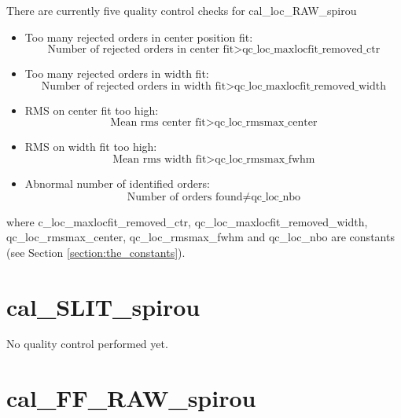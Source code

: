 There are currently five quality control checks for cal\_loc\_RAW\_spirou
\begin{itemize}
\item Too many rejected orders in center position fit: 
	\begin{equation}
	\text{Number of rejected orders in center fit} >\text{qc\_loc\_maxlocfit\_removed\_ctr}
	\end{equation}
\item Too many rejected orders in width fit: 
	\begin{equation}
	\text{Number of rejected orders in width fit} >\text{qc\_loc\_maxlocfit\_removed\_width}
	\end{equation}
\item RMS on center fit too high: 
	\begin{equation}
	\text{Mean rms center fit} > \text{qc\_loc\_rmsmax\_center}
	\end{equation}
\item RMS on width fit too high: 
	\begin{equation}
	\text{Mean rms width fit} > \text{qc\_loc\_rmsmax\_fwhm}
	\end{equation}
\item Abnormal number of identified orders: 
	\begin{equation}
	\text{Number of orders found} \neq \text{qc\_loc\_nbo}
	\end{equation}
\end{itemize}

\noindent where c\_loc\_maxlocfit\_removed\_ctr, qc\_loc\_maxlocfit\_removed\_width, qc\_loc\_rmsmax\_center, qc\_loc\_rmsmax\_fwhm and qc\_loc\_nbo are constants (see Section \ref{section:the_constants}).



\section{cal\_SLIT\_spirou}
\label{section:qc_cal_SLIT_spirou}


No quality control performed yet.


\section{cal\_FF\_RAW\_spirou}
\label{section:qc_cal_FF_RAW_spirou}

